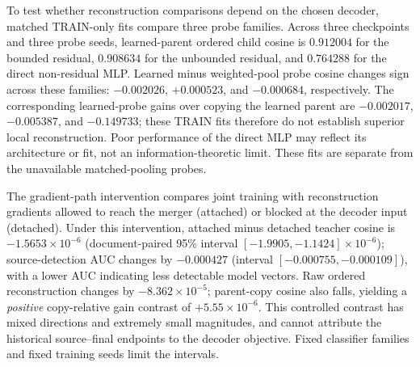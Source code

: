 \documentclass[10pt]{article}
\begin{document}
To test whether reconstruction comparisons depend on the chosen decoder,
matched TRAIN-only fits compare three probe families. Across three checkpoints
and three probe seeds, learned-parent ordered child cosine is \(0.912004\)
for the bounded residual, \(0.908634\) for the unbounded residual, and
\(0.764288\) for the direct non-residual MLP. Learned minus weighted-pool
probe cosine changes sign across these families: \(-0.002026\), \(+0.000523\),
and \(-0.000684\), respectively. The corresponding learned-probe gains over
copying the learned parent are \(-0.002017\), \(-0.005387\), and
\(-0.149733\); these TRAIN fits therefore do not establish superior local
reconstruction. Poor performance of the direct MLP may reflect its architecture
or fit, not an information-theoretic limit. These fits are separate from the
unavailable matched-pooling probes.

The gradient-path intervention compares joint training with reconstruction
gradients allowed to reach the merger (attached) or blocked at the decoder
input (detached). Under this intervention, attached minus detached teacher
cosine is \(-1.5653\times10^{-6}\) (document-paired 95\% interval
\([-1.9905,-1.1424]\times10^{-6}\)); source-detection AUC changes by
\(-0.000427\) (interval \([-0.000755,-0.000109]\)), with a lower AUC indicating
less detectable model vectors. Raw ordered reconstruction changes by
\(-8.362\times10^{-5}\); parent-copy cosine also falls, yielding a \emph{positive}
copy-relative gain contrast of \(+5.55\times10^{-6}\). This controlled contrast
has mixed directions and extremely small magnitudes, and cannot attribute
the historical source--final endpoints to the decoder objective. Fixed
classifier families and fixed training seeds limit the intervals.
\end{document}
